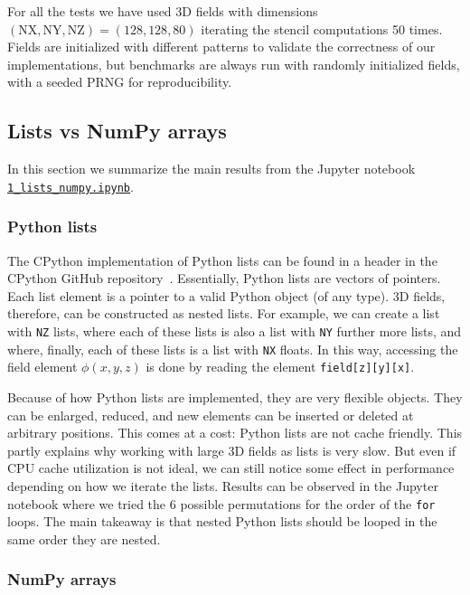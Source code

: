 \documentclass[12pt]{article}
\begin{document}
For all the tests we have used 3D fields with dimensions $(\text{NX}, \text{NY}, \text{NZ}) = (128,128,80)$ iterating the stencil computations 50 times. Fields are initialized with different patterns to validate the correctness of our implementations, but benchmarks are always run with randomly initialized fields, with a seeded PRNG for reproducibility.

\subsection{Lists vs NumPy arrays}

In this section we summarize the main results from the Jupyter notebook \href{run:./1_lists_numpy.ipynb}{\texttt{1\_lists\_numpy.ipynb}}.

\subsubsection{Python lists}

The CPython implementation of Python lists can be found in a header in the CPython GitHub repository~\cite{CPython}. Essentially, Python lists are vectors of pointers. Each list element is a pointer to a valid Python object (of any type). 3D fields, therefore, can be constructed as nested lists. For example, we can create a list with \texttt{NZ} lists, where each of these lists is also a list with \texttt{NY} further more lists, and where, finally, each of these lists is a list with \texttt{NX} floats. In this way, accessing the field element $\phi(x,y,z)$ is done by reading the element \texttt{field[z][y][x]}.

Because of how Python lists are implemented, they are very flexible objects. They can be enlarged, reduced, and new elements can be inserted or deleted at arbitrary positions. This comes at a cost: Python lists are not cache friendly. This partly explains why working with large 3D fields as lists is very slow. But even if CPU cache utilization is not ideal, we can still notice some effect in performance depending on how we iterate the lists. Results can be observed in the Jupyter notebook where we tried the 6 possible permutations for the order of the \texttt{for} loops. The main takeaway is that nested Python lists should be looped in the same order they are nested.

\subsubsection{NumPy arrays}
\end{document}
